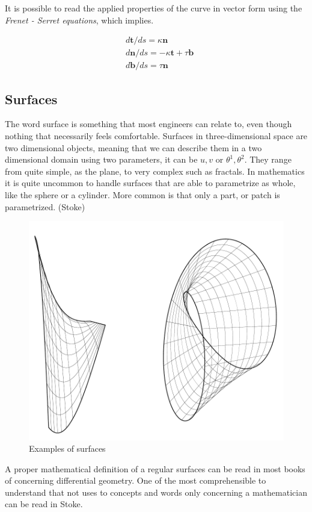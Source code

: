 It is possible to read the applied properties of the curve in vector form using the \textit{Frenet - Serret equations}, which implies.


\begin{align}
&d\textbf{t}/ds = \kappa \textbf{n} \\
&d\textbf{n}/ds = - \kappa \textbf{t} + \tau \textbf{b}\\
&d\textbf{b}/ds = \tau \textbf{n}
\end{align}



\subsection{Surfaces}

The word surface is something that most engineers can relate to, even though nothing that necessarily feels comfortable.  Surfaces in three-dimensional space are two dimensional objects, meaning that we can describe them in a two dimensional domain using two parameters, it can be $u,v$ or $\theta^1,\theta^2$. They range from quite simple, as the plane, to very complex such as fractals. In mathematics it is quite uncommon to handle surfaces that are able to parametrize as whole, like the sphere or a cylinder. More common is that only a part, or patch is parametrized.  (Stoke)

\begin{figure}[H]
\centering
\includegraphics[width=0.7\linewidth]{figure/Theory/surfaces.pdf}
 
\caption{Examples of surfaces  }
\end{figure}


A proper mathematical definition of a regular surfaces can be read in most books of concerning differential geometry. One of the most comprehensible to understand that not uses to concepts and words only concerning a mathematician can be read in Stoke.

